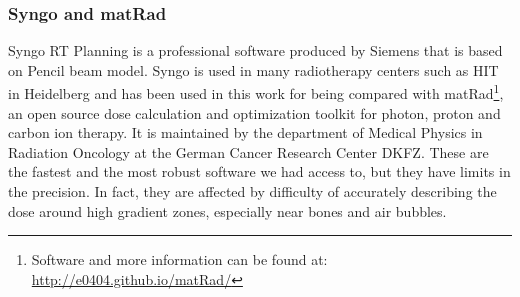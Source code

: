 \documentclass[12pt, a4paper, twoside]{book}
\begin{document}
\subsubsection{Syngo and matRad}
Syngo RT Planning is a professional software produced by Siemens that is based on Pencil beam model. Syngo is used in many radiotherapy centers such as HIT in Heidelberg and has been used in this work for being compared with matRad\footnote{Software and more information can be found at: \url{http://e0404.github.io/matRad/}}, an open source dose calculation and optimization toolkit for photon, proton and carbon ion therapy. It is maintained by the department of Medical Physics in Radiation Oncology at the German Cancer Research Center DKFZ. 
These are the fastest and the most robust software we had access to, but they have limits in the precision. In fact, they are affected by difficulty of accurately describing the dose around high gradient zones, especially near bones and air bubbles.
\end{document}
